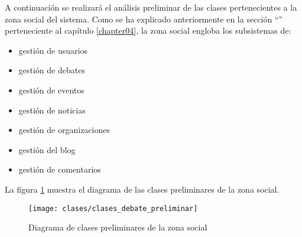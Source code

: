 A continuación se realizará el análisis preliminar de las clases pertenecientes a la zona social del sistema.  Como se ha explicado anteriormente en la sección ``'' perteneciente al capítulo \ref{chapter04}, la zona social engloba los subsistemas de:
\begin{itemize}
	\item gestión de usuarios
	\item gestión de debates
	\item gestión de eventos
	\item gestión de noticias
	\item gestión de organizaciones
	\item gestión del blog
	\item gestión de comentarios
\end{itemize}

La figura \ref{fig:clases_preliminares_modelo_debate} muestra el diagrama de las clases preliminares de la zona social.

\begin{landscape}
	\begin{figure}[ht]
		\centering
		\texttt{[image: clases/clases\_debate\_preliminar]}
		\caption{Diagrama de clases preliminares de la zona social}
		\label{fig:clases_preliminares_modelo_debate}
	\end{figure}
\end{landscape}


